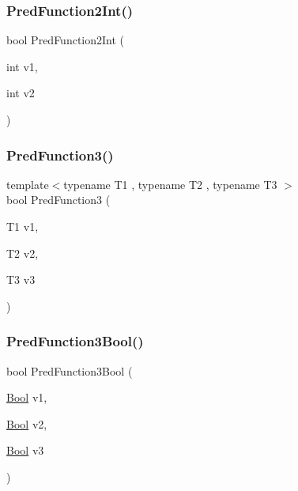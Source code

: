 \subsubsection{\texorpdfstring{PredFunction2Int()}{PredFunction2Int()}}
{\footnotesize\ttfamily bool Pred\+Function2\+Int (\begin{DoxyParamCaption}\item[{int}]{v1,  }\item[{int}]{v2 }\end{DoxyParamCaption})}

\mbox{\label{_obj__test_2lib_2googletest-master_2googletest_2test_2gtest__pred__impl__unittest_8cc_a78a1ff258fe5a85da5b2645983311a70}} 
\subsubsection{\texorpdfstring{PredFunction3()}{PredFunction3()}}
{\footnotesize\ttfamily template$<$typename T1 , typename T2 , typename T3 $>$ \\
bool Pred\+Function3 (\begin{DoxyParamCaption}\item[{T1}]{v1,  }\item[{T2}]{v2,  }\item[{T3}]{v3 }\end{DoxyParamCaption})}

\mbox{\label{_obj__test_2lib_2googletest-master_2googletest_2test_2gtest__pred__impl__unittest_8cc_afa4ce2143c2ffedb2fa5d5f8cff6f6e6}} 
\subsubsection{\texorpdfstring{PredFunction3Bool()}{PredFunction3Bool()}}
{\footnotesize\ttfamily bool Pred\+Function3\+Bool (\begin{DoxyParamCaption}\item[{\mbox{\hyperlink{struct_bool}{Bool}}}]{v1,  }\item[{\mbox{\hyperlink{struct_bool}{Bool}}}]{v2,  }\item[{\mbox{\hyperlink{struct_bool}{Bool}}}]{v3 }\end{DoxyParamCaption})}

